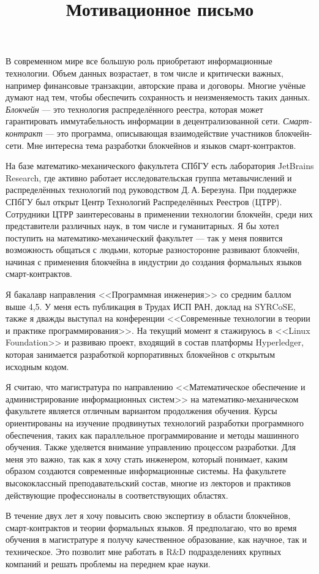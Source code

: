 \documentclass[12pt,a4paper]{article}
\begin{document}
\title{Мотивационное письмо}
\date{}
\author{}
\maketitle
\thispagestyle{empty}
В современном мире все большую роль приобретают информационные технологии.
Объем данных возрастает, в том числе и критически важных, например финансовые транзакции, авторские права и договоры.
Многие учёные думают над тем, чтобы обеспечить сохранность и неизменяемость таких данных.
\emph{Блокчейн} --- это технология распределённого реестра, которая может гарантировать иммутабельность информации в децентрализованной сети.
\emph{Смарт-контракт} --- это программа, описывающая взаимодействие участников блокчейн-сети. 
Мне интересна тема разработки блокчейнов и языков смарт-контрактов.

На базе математико-механического факультета СПбГУ есть лаборатория JetBrains Re\-se\-arch, где активно работает исследовательская группа метавычислений и распределённых технологий под руководством Д.\,А.\,Бе\-ре\-зу\-на.
При поддержке СПбГУ был открыт Центр Технологий Распределённых Реестров (ЦТРР). 
Сотрудники ЦТРР заинтересованы в применении технологии блокчейн, среди них представители различных наук, в том числе и гуманитарных.
Я бы хотел поступить на ма\-те\-ма\-ти\-ко-ме\-ха\-ни\-чес\-кий факультет --- так у меня появится возможность общаться с людьми, которые разносторонне развивают блокчейн, начиная с применения блокчейна в индустрии до создания  формальных языков смарт-контрактов.

Я бакалавр направления <<Программная инженерия>> со средним баллом выше 4,5.
У меня есть публикация в Трудах ИСП РАН, доклад на SYRCoSE, также я дважды выступал на конференции <<Современные технологии в теории и практике программирования>>.
На текущий момент я стажируюсь в <<Linux Foundation>> и развиваю проект, входящий в состав платформы Hyperledger, которая занимается разработкой корпоративных блокчейнов с открытым исходным кодом.

Я считаю, что магистратура по направлению <<Математическое обеспечение и администрирование информационных систем>> на ма\-те\-ма\-ти\-ко-ме\-ха\-ни\-чес\-ком факультете является отличным вариантом продолжения обучения.
Курсы ориентированы на изучение продвинутых технологий разработки программного обеспечения, таких как параллельное программирование и методы машинного обучения.
Также уделяется внимание управлению процессом разработки.
Для меня это важно, так как я хочу стать инженером, который понимает, каким образом создаются современные информационные системы.
На факультете высококлассный преподавательский состав, многие из лекторов и практиков действующие профессионалы в соответствующих областях.

В течение двух лет я хочу повысить свою экспертизу в области блокчейнов, смарт-кон\-трак\-тов и теории формальных языков.
Я предполагаю, что во время обучения в магистратуре я получу качественное образование, как научное, так и техническое.
Это позволит мне работать в R\&D подразделениях крупных компаний и решать проблемы на переднем крае науки.
\end{document}
